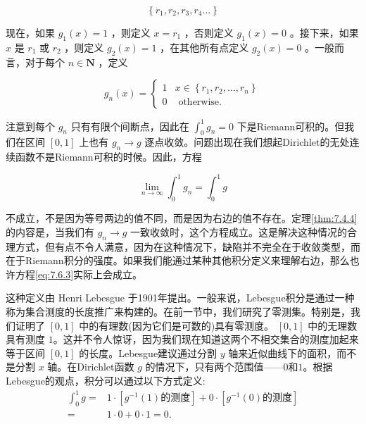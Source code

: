 \[
\left\{  {{r}_{1},{r}_{2},{r}_{3},{r}_{4}\ldots }\right\}
\]

现在，如果 \({g}_{1}\left( x\right)  = 1\) ，则定义 \(x = {r}_{1}\) ，否则定义 \({g}_{1}\left( x\right)  = 0\) 。接下来，如果 \(x\) 是 \({r}_{1}\) 或 \({r}_{2}\) ，则定义 \({g}_{2}\left( x\right)  = 1\) ，在其他所有点定义 \({g}_{2}\left( x\right)  = 0\) 。一般而言，对于每个 \(n \in  \mathbf{N}\) ，定义

\[
{g}_{n}\left( x\right)  = \left\{  \begin{array}{ll} 1 & x \in  \left\{  {{r}_{1},{r}_{2},\ldots ,{r}_{n}}\right\}  \\  0 & \text{ otherwise. } \end{array}\right.
\]

注意到每个 \({g}_{n}\) 只有有限个间断点，因此在 \({\int }_{0}^{1}{g}_{n} = 0\) 下是Riemann可积的。但我们在区间 \(\left\lbrack  {0,1}\right\rbrack\) 上也有 \({g}_{n} \rightarrow  g\) 逐点收敛。问题出现在我们想起Dirichlet的无处连续函数不是Riemann可积的时候。因此，方程

\begin{equation}
\label{eq:7.6.3}
\mathop{\lim }\limits_{{n \rightarrow  \infty }}{\int }_{0}^{1}{g}_{n} = {\int }_{0}^{1}g
\end{equation}

不成立，不是因为等号两边的值不同，而是因为右边的值不存在。定理\ref{thm:7.4.4}的内容是，当我们有 \({g}_{n} \rightarrow  g\) 一致收敛时，这个方程成立。这是解决这种情况的合理方式，但有点不令人满意，因为在这种情况下，缺陷并不完全在于收敛类型，而在于Riemann积分的强度。如果我们能通过某种其他积分定义来理解右边，那么也许方程\eqref{eq:7.6.3}实际上会成立。

这种定义由 Henri Lebesgue 于1901年提出。一般来说，Lebesgue积分是通过一种称为集合测度的长度推广来构建的。在前一节中，我们研究了零测集。特别是，我们证明了 \(\left\lbrack  {0,1}\right\rbrack\) 中的有理数(因为它们是可数的)具有零测度。 \(\left\lbrack  {0,1}\right\rbrack\) 中的无理数具有测度 $1$。这并不令人惊讶，因为我们现在知道这两个不相交集合的测度加起来等于区间 \(\left\lbrack  {0,1}\right\rbrack\) 的长度。Lebesgue建议通过分割 \(y\) 轴来近似曲线下的面积，而不是分割 \(x\) 轴。在Dirichlet函数 \(g\) 的情况下，只有两个范围值——$0$和$1$。根据Lebesgue的观点，积分可以通过以下方式定义:
\begin{align*}
  {\int }_{0}^{1}g = & 1 \cdot  \left\lbrack  {g^{-1}(1)\text{的测度}}\right\rbrack   + 0 \cdot  \left\lbrack  {g^{-1}(0) \text{的测度}}\right\rbrack\\
  = & 1 \cdot  0 + 0 \cdot  1 = 0.
\end{align*}



